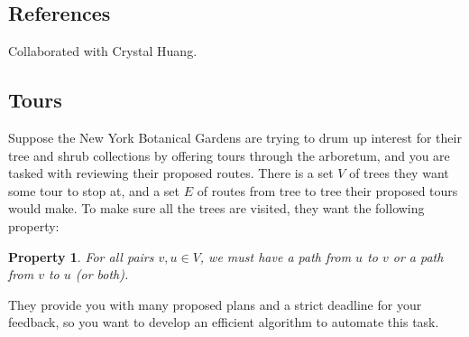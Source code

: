 \def\lc{\left\lceil}   
\def\rc{\right\rceil}
\newtheorem{claim}{Claim}
\newtheorem{property}{Property}
\runningheadrule
\firstpageheadrule
\cfoot{}
\subsection*{References}
Collaborated with Crystal Huang.
\subsection{Tours}
Suppose the New York Botanical Gardens are trying to drum up interest for their tree and shrub collections by offering tours through the arboretum, and you are tasked with reviewing their proposed routes. There is a set $V$ of trees they want some tour to stop at, and a set $E$ of routes from tree to tree their proposed tours would make. To make sure all the trees are visited, they want the following property:
\begin{property} 
For all pairs $v, u\in V$, we must have a path from $u$ to $v$ or a path from $v$ to $u$ (or both). 
\end{property}
\noindent They provide you with many proposed plans and a strict deadline for your feedback, so you want to develop an efficient algorithm to automate this task. 

